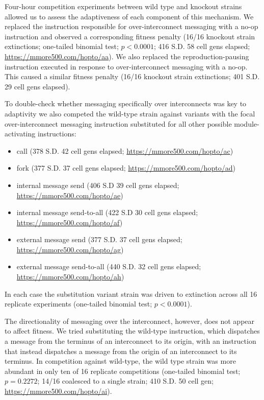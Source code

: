 Four-hour competition experiments between wild type and knockout strains allowed us to assess the adaptiveness of each component of this mechanism.
We replaced the instruction responsible for over-interconnect messaging with a no-op instruction and observed a corresponding fitness penalty (16/16 knockout strain extinctions; one-tailed binomial test; $p < 0.0001$; 416 S.D. 58 cell gens elapsed; \url{https://mmore500.com/hopto/aa}).
We also replaced the reproduction-pausing instruction executed in response to over-interconnect messaging with a no-op.
This caused a similar fitness penalty (16/16 knockout strain extinctions; 401 S.D. 29 cell gens elapsed).

To double-check whether messaging specifically over interconnects was key to adaptivity we also competed the wild-type strain against variants with the focal over-interconnect messaging instruction substituted for all other possible module-activating instructions:
\begin{itemize}
  \item call (378 S.D. 42 cell gens elapsed; \url{https://mmore500.com/hopto/ac})
  \item fork (377 S.D. 37 cell gens elapsed; \url{https://mmore500.com/hopto/ad})
  \item internal message send (406 S.D 39 cell gens elapsed; \url{https://mmore500.com/hopto/ae})
  \item internal message send-to-all (422 S.D 30 cell gens elapsed; \url{https://mmore500.com/hopto/af})
  \item external message send (377 S.D. 37 cell gens elapsed; \url{https://mmore500.com/hopto/ag})
  \item external message send-to-all (440 S.D. 32 cell gens elapsed; \url{https://mmore500.com/hopto/ah})
\end{itemize}
In each case the substitution variant strain was driven to extinction across all 16 replicate experiments (one-tailed binomial test; $p < 0.0001$).


The directionality of messaging over the interconnect, however, does not appear to affect fitness.
We tried substituting the wild-type instruction, which dispatches a message from the terminus of an interconnect to its origin, with an instruction that instead dispatches a message from the origin of an interconnect to its terminus.
In competition against wild-type, the wild type strain was more abundant in only ten of 16 replicate competitions (one-tailed binomial test; $p = 0.2272$; 14/16 coalesced to a single strain; 410 S.D. 50 cell gen; \url{https://mmore500.com/hopto/ai}).


